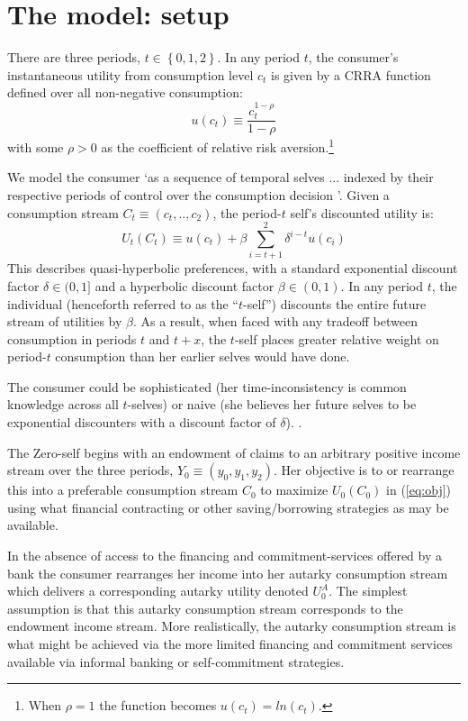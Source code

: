 \documentclass[11pt,english]{article}
\theoremstyle{plain}
\theoremstyle{definition}
\begin{document}
\section{The model: setup}

There are three periods, $t\in\left\{ 0,1,2\right\} $. In any period
$t$, the consumer's instantaneous utility from consumption level
$c_{t}$ is given by a CRRA function defined over all non-negative
consumption:
\begin{equation}
u\left(c_{t}\right)\equiv\frac{c_{t}^{1-\rho}}{1-\rho}
\end{equation}
with some $\rho>0$ as the coefficient of relative risk aversion.\footnote{When $\rho=1$ the function becomes $u(c_t)=ln(c_t)$.} 

We model the consumer `as a sequence of temporal selves ... indexed by their respective periods of control over the consumption decision \citet[][p.451]{laibson1997}'. Given a consumption stream $C_{t}\equiv\left(c_{t},..,c_{2}\right)$,
the period-$t$ self's discounted utility is: 
\begin{equation}
U_{t}\left(C_{t}\right)\equiv u\left(c_{t}\right)+\beta\sum\limits _{i=t+1}^{2}\delta^{i-t}u\left(c_{i}\right)\label{eq:obj}
\end{equation}
This describes quasi-hyperbolic preferences, with a standard exponential
discount factor $\delta\in(0,1]$ and a hyperbolic discount factor
$\beta\in(0,1)$. In any period $t$, the individual (henceforth referred
to as the ``$t$-self'') discounts the entire future stream of utilities
by $\beta$. As a result, when faced with any tradeoff between consumption
in periods $t$ and $t+x$, the $t$-self places greater relative
weight on period-$t$ consumption than her earlier selves would have done. 

The consumer could be sophisticated (her time-inconsistency is common
knowledge across all $t$-selves) or naive (she believes her future
selves to be exponential discounters with a discount factor of $\delta$).
\citep{odonoghue2001}.

The Zero-self begins with an endowment of claims to an arbitrary positive
income stream over the three periods, $Y_{0}\equiv\left(y_{0},y_{1},y_{2}\right)$.
Her objective is to or rearrange this into a preferable consumption stream
$C_{0}$ to maximize $U_{0}(C_{0})$ in (\ref{eq:obj}) using what
financial contracting or other saving/borrowing strategies as may be available.

In the absence of access to the financing and commitment-services offered by a bank the consumer rearranges her income
into her autarky consumption stream which delivers a corresponding
autarky utility denoted $U_{0}^{A}$. The simplest assumption is that this autarky consumption stream corresponds to  the endowment income stream. More realistically,  the autarky consumption stream is what might be achieved via the more limited financing and commitment services available via informal banking or self-commitment strategies.  
\end{document}
